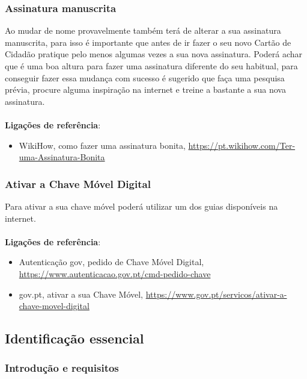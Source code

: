 \subsubsection{Assinatura manuscrita}

Ao mudar de nome provavelmente também terá de alterar a sua assinatura
manuscrita, para isso é importante que antes de ir fazer o seu novo
Cartão de Cidadão pratique pelo menos algumas vezes a sua nova
assinatura. Poderá achar que é uma boa altura para fazer uma assinatura
diferente do seu habitual, para conseguir fazer essa mudança com sucesso
é sugerido que faça uma pesquisa prévia, procure alguma inspiração na
internet e treine a bastante a sua nova assinatura. \\
\\
\textbf{Ligações de referência}:
\begin{itemize}
	\item WikiHow, como fazer uma assinatura bonita, \url{https://pt.wikihow.com/Ter-uma-Assinatura-Bonita}
\end{itemize}

\subsubsection{Ativar a Chave Móvel Digital}

Para ativar a sua chave móvel poderá utilizar um dos guias disponíveis
na internet. \\
\\
\textbf{Ligações de referência}:
\begin{itemize}
	\item Autenticação gov, pedido de Chave Móvel Digital, \url{https://www.autenticacao.gov.pt/cmd-pedido-chave}
	\item gov.pt, ativar a sua Chave Móvel, \url{https://www.gov.pt/servicos/ativar-a-chave-movel-digital}
\end{itemize}

\subsection{Identificação essencial}

\subsubsection{Introdução e requisitos}

